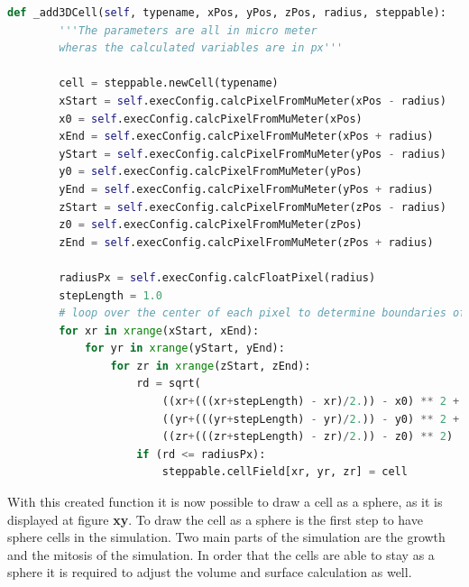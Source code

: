 \begin{lstlisting}[language=Python, caption = Function to draw a cell as a sphere. First all required points for the calculation are converted into the voxel unit. Then over each axis of the cuboid it is iterated. During these iterations for each voxel the distance to the center of the cuboid and sphere is calculated and then it is checked if the voxel is within the sphere or not. If the voxel is a part of the sphere it will be added to the sphere.]
    def _add3DCell(self, typename, xPos, yPos, zPos, radius, steppable):
        '''The parameters are all in micro meter
        wheras the calculated variables are in px'''

        cell = steppable.newCell(typename)
        xStart = self.execConfig.calcPixelFromMuMeter(xPos - radius)
        x0 = self.execConfig.calcPixelFromMuMeter(xPos)
        xEnd = self.execConfig.calcPixelFromMuMeter(xPos + radius)
        yStart = self.execConfig.calcPixelFromMuMeter(yPos - radius)
        y0 = self.execConfig.calcPixelFromMuMeter(yPos)
        yEnd = self.execConfig.calcPixelFromMuMeter(yPos + radius)
        zStart = self.execConfig.calcPixelFromMuMeter(zPos - radius)
        z0 = self.execConfig.calcPixelFromMuMeter(zPos)
        zEnd = self.execConfig.calcPixelFromMuMeter(zPos + radius)

        radiusPx = self.execConfig.calcFloatPixel(radius)
        stepLength = 1.0
        # loop over the center of each pixel to determine boundaries of the circle
        for xr in xrange(xStart, xEnd):
            for yr in xrange(yStart, yEnd):
                for zr in xrange(zStart, zEnd):
                    rd = sqrt(
                        ((xr+(((xr+stepLength) - xr)/2.)) - x0) ** 2 +
                        ((yr+(((yr+stepLength) - yr)/2.)) - y0) ** 2 +
                        ((zr+(((zr+stepLength) - zr)/2.)) - z0) ** 2)
                    if (rd <= radiusPx):
                        steppable.cellField[xr, yr, zr] = cell
\end{lstlisting}

With this created function it is now possible to draw a cell as a sphere, as it is displayed at figure \textbf{xy}. \newline
To draw the cell as a sphere is the first step to have sphere cells in the simulation. Two main parts of the simulation are the growth and the mitosis of the simulation. In order that the cells are able to stay as a sphere it is required to adjust the volume and surface calculation as well.


